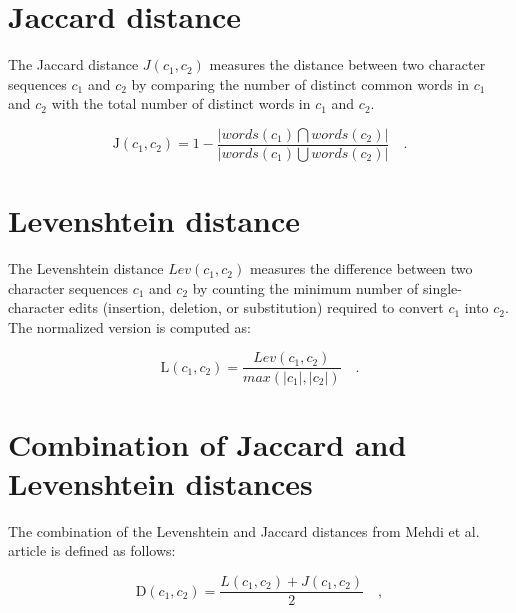 \documentclass[a4paper, 12pt]{book}
\begin{document}
\section{Jaccard distance}
\label{sec:jaccard-definition}

The Jaccard distance $J(c_{1}, c_{2})$ measures the distance between two character sequences $c_{1}$ and $c_{2}$ by comparing the number of distinct common words in $c_{1}$ and $c_{2}$ with the total number of distinct words in $c_{1}$ and $c_{2}$. 

\begin{center}
    \begin{equation}
    \mathrm{J}(c_{1}, c_{2}) = 1 - \frac{\left | words(c_{1})\bigcap words(c_{2}) \right | }{\left | words(c_{1})\bigcup words(c_{2}) \right | } \quad .
    \end{equation}
\end{center}

\section{Levenshtein distance}
\label{sec:levenshtein-definition}

The Levenshtein distance $Lev(c_{1}, c_{2})$ measures the difference between two character sequences $c_{1}$ and $c_{2}$ by counting the minimum number of single-character edits (insertion, deletion, or substitution) required to convert $c_{1}$ into $c_{2}$. The normalized version is computed as: 

\begin{center}
    \begin{equation}
        \mathrm{L}(c_{1}, c_{2}) = \frac{\textit{Lev}(c_{1}, c_{2})}{\textit{max}(\left | c_{1} \right |, \left | c_{2} \right | )} \quad .
    \end{equation}
\end{center}

\section{Combination of Jaccard and Levenshtein distances}
\label{sec:jacc-lev-comb-definition}

The combination of the Levenshtein and Jaccard distances from Mehdi et al. article is defined as follows:

\begin{center}
    \begin{equation}
        \mathrm{D}(c_{1}, c_{2}) = \frac{\textit{L}(c_{1}, c_{2}) + \textit{J}(c_{1}, c_{2})}{2} \quad ,
    \end{equation}
\end{center}
\end{document}
